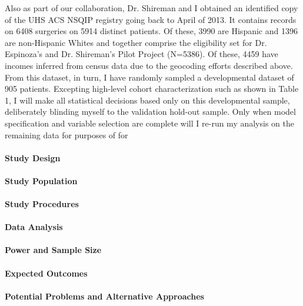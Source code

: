 Also as part of our collaboration, Dr. Shireman and I obtained an identified copy of the UHS ACS NSQIP registry going back to April of 2013. It contains records on 6408 surgeries on 5914 distinct patients. Of these, 3990 are Hispanic and 1396 are non-Hispanic Whites and together comprise the eligibility set for Dr. Espinoza's and Dr. Shireman's Pilot Project (N=5386). Of these, 4459 have incomes inferred from census data due to the geocoding efforts described above. From this dataset, in turn, I have randomly sampled a developmental dataset of 905 patients. Excepting high-level cohort characterization such as shown in Table 1, I will make all statistical decisions based only on this developmental sample, deliberately blinding myself to the validation hold-out sample. Only when model specification and variable selection are complete will I re-run my analysis on the remaining data for purposes of for


\paragraph{Study Design}\label{study-design}


\paragraph{Study Population}\label{study-population}


\paragraph{Study Procedures}\label{study-procedures}


\paragraph{Data Analysis}\label{data-analysis}

\paragraph{Power and Sample Size}\label{power-and-sample-size}

\paragraph{Expected Outcomes}\label{expected-outcomes}

\paragraph{Potential Problems and Alternative
      Approaches}\label{potential-problems-and-alternative-approaches}

